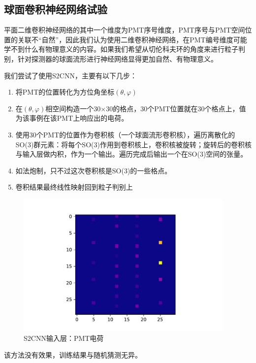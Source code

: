 \documentclass{ctexart}
\begin{document}
\subsection{球面卷积神经网络试验} %
\label{sub:球面卷积神经网络试验}
平面二维卷积神经网络的其中一个维度为PMT序号维度，PMT序号与PMT空间位置的关联不“自然”，因此我们认为使用二维卷积神经网络，在PMT编号维度可能学不到什么有物理意义的内容。如果我们希望从切伦科夫环的角度来进行粒子判别，针对探测器的球面流形进行神经网络显得更加自然、有物理意义。

我们尝试了使用S2CNN，主要有以下几步：
\begin{enumerate}
    \item 将PMT的位置转化为方位角坐标$(\theta, \varphi)$
    \item 在$(\theta, \varphi)$相空间构造一个30$\times$30的格点，30个PMT位置就在30个格点上，值为该事例在该PMT上响应出的电荷。
    \item 使用30个PMT的位置作为卷积核（一个球面流形卷积核），遍历离散化的SO(3)群元素：将每个SO(3)作用到卷积核上，卷积核被旋转；旋转后的卷积核与输入层做内积，作为一个输出。遍历完成后输出一个在SO(3)空间的张量。
    \item 如法炮制，只不过这次卷积核是SO(3)的一些格点。
    \item 卷积结果最终线性映射回到粒子判别上
\end{enumerate}

\begin{figure}[H]
    \centering
        \includegraphics[width=0.95\textwidth]{S2CNN_input.pdf}
    \caption{S2CNN输入层：PMT电荷}
    \label{fig:S2CNN_input}
\end{figure}

该方法没有效果，训练结果与随机猜测无异。
\end{document}
